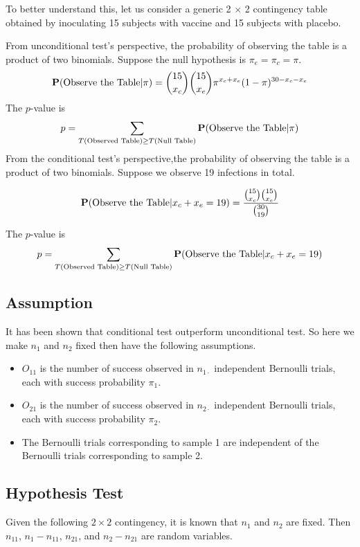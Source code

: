 To better understand this, let us consider a generic 2 $\times$ 2 contingency table obtained by inoculating 15 subjects with vaccine and 15 subjects with placebo.



From unconditional test's perspective, the probability of observing the table is a product of two binomials. Suppose the null hypothesis is $\pi_e = \pi_c = \pi$.
\[\P(\text{Observe the Table} | \pi) = {15 \choose x_c} {15 \choose x_e} \pi^{x_c + x_e} (1 - \pi)^{30 - x_c -x_e}\]
The $p$-value is 
\[p = \sum_{T(\text{Observed Table}) \ge T(\text{Null Table})} \P(\text{Observe the Table} | \pi)\]
From the conditional test's perspective,the probability of observing the table is a product of two binomials. Suppose we observe 19 infections in total.

\[\P(\text{Observe the Table} | x_c + x_e = 19) = \frac{{15 \choose x_c} {15 \choose x_e}}{{30 \choose 19}}\]

The $p$-value is 
\[p = \sum_{T(\text{Observed Table}) \ge T(\text{Null Table})} \P(\text{Observe the Table} | x_c + x_e = 19)\]
\subsection{Assumption}
It has been shown that conditional test outperform unconditional test. So here we make $n_1$ and $n_2$ fixed then have the following assumptions.
\begin{itemize}
	\item $O_{11}$ is the number of success observed in $n_{1\cdot}$ independent Bernoulli trials, each with success probability $\pi_1$.
	\item $O_{21}$ is the number of success observed in $n_{2\cdot}$ independent Bernoulli trials, each with success probability $\pi_2$.
	\item The Bernoulli trials corresponding to sample 1 are independent of the Bernoulli trials corresponding to sample 2.
\end{itemize}


\subsection{Hypothesis Test}
Given the following $2\times 2$ contingency, it is known that $n_1$ and $n_2$ are fixed. Then $n_{11}$, $n_1 - n_{11}$, $n_{21}$, and $n_2 - n_{21}$ are random variables.

